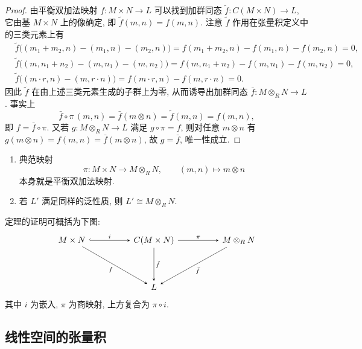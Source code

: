 \begin{proof}
由平衡双加法映射 $f\colon M\times N\to L$ 可以找到加群同态
$\tilde f\colon C(M\times N)\to L$, 它由基 $M\times N$ 上的像确定, 即 $\tilde f(m,n)=f(m,n)$.
注意 $\tilde f$ 作用在张量积定义中的三类元素上有
\[
  \begin{aligned}
    &\tilde f\bigl((m_1+m_2,n)-(m_1,n)-(m_2,n)\bigr)=f(m_1+m_2,n)-f(m_1,n)-f(m_2,n)=0,\\
    &\tilde f\bigl((m,n_1+n_2)-(m,n_1)-(m,n_2)\bigr)=f(m,n_1+n_2)-f(m,n_1)-f(m,n_2)=0,\\
    &\tilde f\bigl((m\cdot r,n)-(m,r\cdot n)\bigr)=f(m\cdot r,n)-f(m,r\cdot n)=0 .
  \end{aligned}
\]
因此 $\tilde f$ 在由上述三类元素生成的子群上为零, 从而诱导出加群同态 $\bar f\colon M\otimes_R N\to L$.
事实上
\[
  \bar f\circ\pi\,(m,n)=\bar f(m\otimes n)=\tilde f(m,n)=f(m,n),
\]
即 $f=\bar f\circ\pi$. 又若 $g\colon M\otimes_R N\to L$ 满足 $g\circ\pi=f$, 则对任意 $m\otimes n$ 有
$g(m\otimes n)=f(m,n)=\bar f(m\otimes n)$, 故 $g=\bar f$, 唯一性成立.
\end{proof}

\begin{remark}\label{rem:tensor-universal}
\mbox{}\par\vspace{-0.2em}
\begin{enumerate}
\item 典范映射
\[
  \pi\colon M\times N\longrightarrow M\otimes_R N,\qquad (m,n)\longmapsto m\otimes n
\]
本身就是平衡双加法映射.

\item 若 $L'$ 满足同样的泛性质, 则 $L'\cong M\otimes_R N$.
\end{enumerate}
\end{remark}

\begin{remark}[证明的结构]\label{rem:tensor-proof-pic}
定理的证明可概括为下图:
\[
  \begin{tikzcd}[row sep=1.4cm, column sep=1.7cm, arrows={->,>=stealth}]
    M\times N \arrow[r,hook,"i"] \arrow[dr,"f"'] & C(M\times N) \arrow[r,"\pi"] \arrow[d,"\tilde f"] & M\otimes_R N \arrow[dl,"\bar f"] \\
    & L &
  \end{tikzcd}
\]
其中 $i$ 为嵌入, $\pi$ 为商映射, 上方复合为 $\pi\circ i$.
\end{remark}

\subsection{线性空间的张量积}


